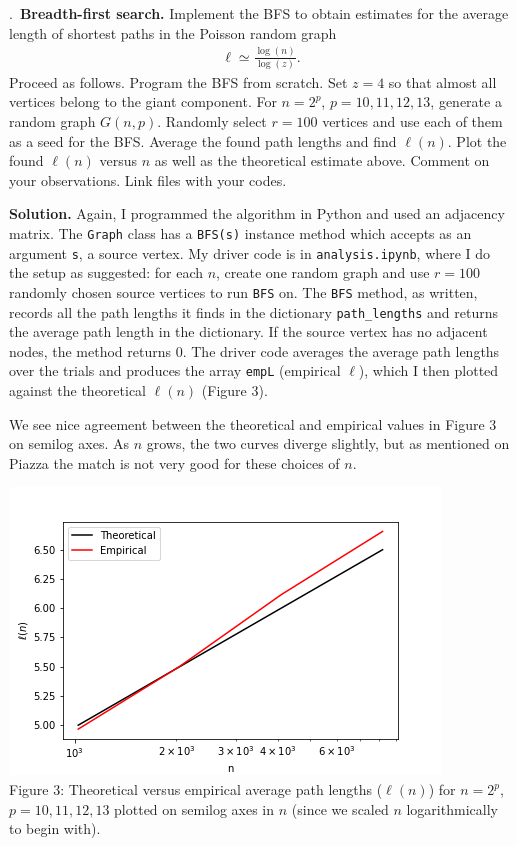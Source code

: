 \documentclass{letter}
\newcounter{problem}
\newcommand{\Problem}[2]{%
	\stepcounter{problem}%
	\leftskip=0pt%
	\theproblem.~\textbf{{#1.}} #2 \par%
}
\newcommand{\Solution}[1]{%
	\textbf{Solution.} #1 \par%
}
\begin{document}
    \Problem{Breadth-first search}{Implement the BFS to obtain estimates for the average length of shortest paths in the Poisson random graph \begin{align*}
        \ell \simeq \frac{\log(n)}{\log(z)}.
    \end{align*} Proceed as follows. Program the BFS from scratch. Set $z = 4$ so that almost all vertices belong to the giant component. For $n = 2^p$, $p = 10, 11, 12, 13$, generate a random graph $G(n,p)$. Randomly select $r = 100$ vertices and use each of them as a seed for the BFS. Average the found path lengths and find $\ell(n)$. Plot the found $\ell(n)$ versus $n$ as well as the theoretical estimate above. Comment on your observations. Link files with your codes.}
    \Solution{Again, I programmed the algorithm in Python and used an adjacency matrix. The \texttt{Graph} class has a \texttt{BFS(s)} instance method which accepts as an argument \texttt{s}, a source vertex. My driver code is in \texttt{analysis.ipynb}, where I do the setup as suggested: for each $n$, create one random graph and use $r = 100$ randomly chosen source vertices to run \texttt{BFS} on. The \texttt{BFS} method, as written, records all the path lengths it finds in the dictionary \texttt{path\_lengths} and returns the average path length in the dictionary. If the source vertex has no adjacent nodes, the method returns 0. The driver code averages the average path lengths over the trials and produces the array \texttt{empL} (empirical $\ell$), which I then plotted against the theoretical $\ell(n)$ (Figure 3).

    We see nice agreement between the theoretical and empirical values in Figure 3 on semilog axes. As $n$ grows, the two curves diverge slightly, but as mentioned on Piazza the match is not very good for these choices of $n$.
    
    \begin{center}
        \includegraphics{../code/bfsstats.png} \\
        Figure 3: Theoretical versus empirical average path lengths ($\ell(n)$) for $n = 2^p$, $p = 10, 11, 12, 13$ plotted on semilog axes in $n$ (since we scaled $n$ logarithmically to begin with).
    \end{center}}
\end{document}
